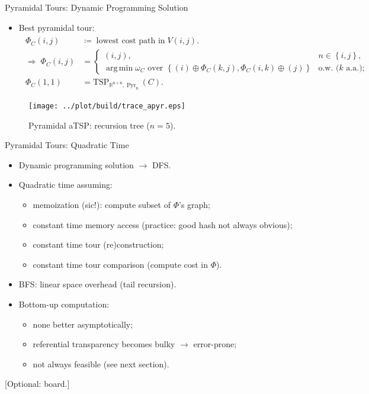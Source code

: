 \documentclass[
  size=8pt,
  style=klope,
  paper=screen,
  pauseslide,
  nopagebreaks,
  hlsections,
  fleqn
]{powerdot}
\DeclareMathOperator*{\argmin}{arg\,min}
\def\board{{\color{green} [Optional: board.]}}
\begin{document}
\begin{slide}[toc=]{Pyramidal Tours: Dynamic Programming Solution}
\begin{itemize}
  \item
    Best pyramidal tour:
    \begin{align}
    \begin{split}
      \Phi_C\left(i,j\right) & \coloneqq \; \text{lowest cost path in} \; V\left(i,j\right).
    \\
    \Rightarrow \;
    \Phi_C\left(i,j\right) & =
    \begin{cases}
      \left(i,j\right), & n \in \left\{i,j\right\}, \\
      \argmin \omega_C \text{ over }
      \left\{
      \left(i\right) \oplus \Phi_C\left(k,j\right)
      ,
      \Phi_C\left(i,k\right) \oplus \left(j\right)
      \right\}
      & \text{o.w.\ ($k$ a.a.)};
    \end{cases}
    \\
    \Phi_C\left(1,1\right) & = \operatorname{TSP_{\mathbb{R}^{n \times n},\operatorname{Pyr}_n}}\left(C\right).
    \end{split}
  \end{align}
\end{itemize}
\vspace{-3mm}
\begin{figure}[H]
  \centering
  \texttt{[image: ../plot/build/trace\_apyr.eps]}
  \caption{Pyramidal aTSP: recursion tree ($n = 5$).}
\end{figure}
\end{slide}

\begin{slide}[toc=Dynamic Programming${,}$ Recursion and Complexity]{Pyramidal Tours: Quadratic Time}
  \begin{itemize}
  \item
  Dynamic programming solution $\rightarrow$ DFS.
  \item
  Quadratic time assuming:
  \begin{itemize}
    \item memoization (sic!): compute subset of $\Phi$'s graph;
    \item constant time memory access (practice: good hash not always obvious);
    \item constant time tour (re)construction;
    \item constant time tour comparison (compute cost in $\Phi$).
  \end{itemize}
  \item
  BFS: linear space overhead (tail recursion).
  \item
  Bottom-up computation:
  \begin{itemize}
    \item
    none better asymptotically;
    \item
    referential transparency becomes bulky $\rightarrow$ error-prone;
    \item
    not always feasible (see next section).
  \end{itemize}
  \end{itemize}
\board
\end{slide}
\end{document}
